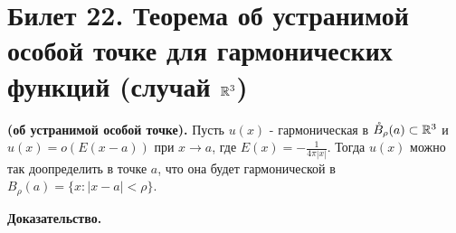 \section{Билет 22. Теорема об устранимой особой точке для гармонических функций (случай $\mathbb{R}^3$)}
 

\begin{theorem}

{\bf (об  устранимой особой точке).} 
Пусть $u(x)$ - гармоническая в $\mathring{B}_\rho(a) \subset 
\mathbb{R}^3$ и $u(x)=o(E(x-a))$ при $x \to a$, где $E(x) = -\frac{1}{4 \pi |x|}$. Тогда $u(x)$ можно так доопределить в точке $a$, что она будет гармонической в $B_\rho(a) = \{x: |x-a|<\rho \}$.

\end{theorem}

\textbf{Доказательство.}


